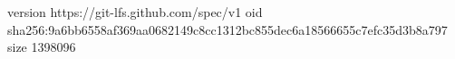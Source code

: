 version https://git-lfs.github.com/spec/v1
oid sha256:9a6bb6558af369aa0682149c8cc1312bc855dec6a18566655c7efc35d3b8a797
size 1398096
